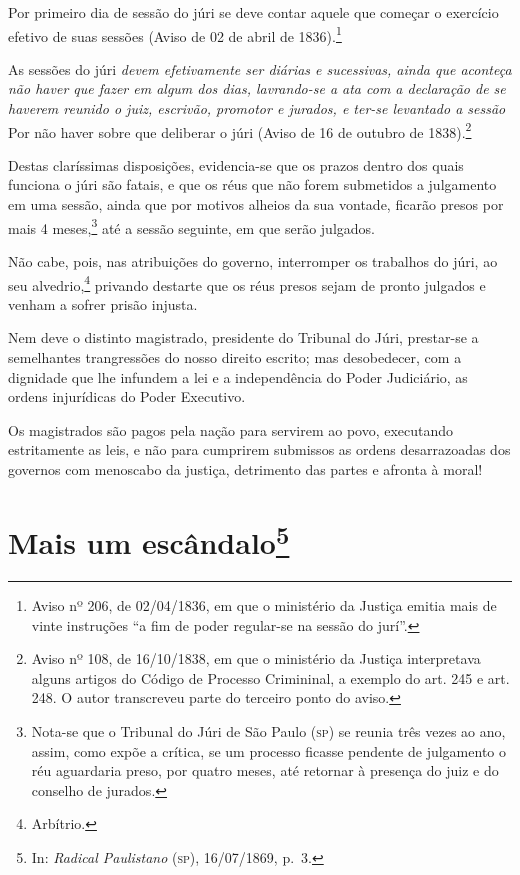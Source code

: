 Por primeiro dia de sessão do júri se deve contar aquele que começar o
exercício efetivo de suas sessões (Aviso de 02 de abril de
1836).\footnote{Aviso nº 206, de 02/04/1836, em que o ministério da
  Justiça emitia mais de vinte instruções ``a fim de poder regular-se na
  sessão do jurí''.}

As sessões do júri \emph{devem efetivamente ser diárias e sucessivas,
ainda que aconteça não haver que fazer em algum dos dias, lavrando-se a
ata com a declaração de se haverem reunido o juiz, escrivão, promotor e
jurados, e ter-se levantado a sessão} Por não haver sobre que deliberar
o júri (Aviso de 16 de outubro de 1838).\footnote{Aviso nº 108, de
  16/10/1838, em que o ministério da Justiça interpretava alguns artigos
  do Código de Processo Crimininal, a exemplo do art. 245 e art. 248. O
  autor transcreveu parte do terceiro ponto do aviso.}

Destas claríssimas disposições, evidencia-se que os prazos dentro dos
quais funciona o júri são fatais, e que os réus que não forem submetidos
a julgamento em uma sessão, ainda que por motivos alheios da sua
vontade, ficarão presos por mais 4 meses,\footnote{Nota-se que o
  Tribunal do Júri de São Paulo (\textsc{sp}) se reunia três vezes ao ano, assim,
  como expõe a crítica, se um processo ficasse pendente de julgamento o
  réu aguardaria preso, por quatro meses, até retornar à presença do
  juiz e do conselho de jurados.} até a sessão seguinte, em que serão
julgados.

Não cabe, pois, nas atribuições do governo, interromper os trabalhos do
júri, ao seu alvedrio,\footnote{Arbítrio.} privando destarte que os
réus presos sejam de pronto julgados e venham a sofrer prisão injusta.

Nem deve o distinto magistrado, presidente do Tribunal do Júri,
prestar-se a semelhantes trangressões do nosso direito escrito; mas
desobedecer, com a dignidade que lhe infundem a lei e a independência do
Poder Judiciário, as ordens injurídicas do Poder Executivo.

Os magistrados são pagos pela nação para servirem ao povo, executando
estritamente as leis, e não para cumprirem submissos as ordens
desarrazoadas dos governos com menoscabo da justiça, detrimento das
partes e afronta à moral!

\chapter{Mais um escândalo\footnote{In: \emph{Radical Paulistano} (\textsc{sp}),
  16/07/1869, p.~3.}}

